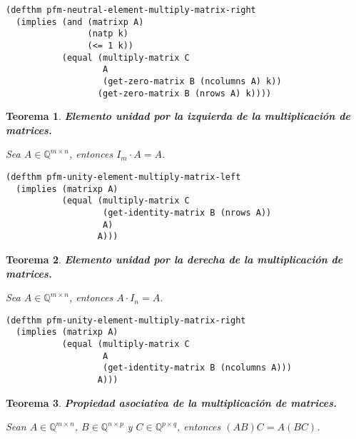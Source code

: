 \documentclass[a4paper,10pt]{article}
\newcommand{\M}[3]{#1 \in \mathbb{Q}^{#2 \times #3}}
\newtheorem{teor}{{Teorema}}
\begin{document}
\begin{lstlisting}[language=clips]
(defthm pfm-neutral-element-multiply-matrix-right
  (implies (and (matrixp A)
                (natp k)
                (<= 1 k))
           (equal (multiply-matrix C 
                   A 
                   (get-zero-matrix B (ncolumns A) k))
                  (get-zero-matrix B (nrows A) k))))
\end{lstlisting}	

\par \vspace{16pt}

\begin{teor} \textbf{Elemento unidad por la izquierda de la multiplicación de matrices.}\vspace{8pt}\par
Sea $\M{A}{m}{n}$, entonces $I_m\cdot A = A$.
\end{teor}

\begin{lstlisting}[language=clips]
(defthm pfm-unity-element-multiply-matrix-left
  (implies (matrixp A)
           (equal (multiply-matrix C 
                   (get-identity-matrix B (nrows A)) 
                   A)
                  A)))
\end{lstlisting}	

\par \vspace{16pt}

\begin{teor} \textbf{Elemento unidad por la derecha de la multiplicación de matrices.}\vspace{8pt}\par
Sea $\M{A}{m}{n}$, entonces $A \cdot I_n = A$.
\end{teor}

\begin{lstlisting}[language=clips]
(defthm pfm-unity-element-multiply-matrix-right
  (implies (matrixp A)
           (equal (multiply-matrix C 
                   A 
                   (get-identity-matrix B (ncolumns A)))
                  A)))
\end{lstlisting}	

\par \vspace{16pt}

\begin{teor} \textbf{Propiedad asociativa de la multiplicación de matrices.}\vspace{8pt}\par
Sean $\M{A}{m}{n}$, $\M{B}{n}{p}$ y $\M{C}{p}{q}$, entonces $(AB)C = A(BC)$.
\end{teor}
\end{document}

